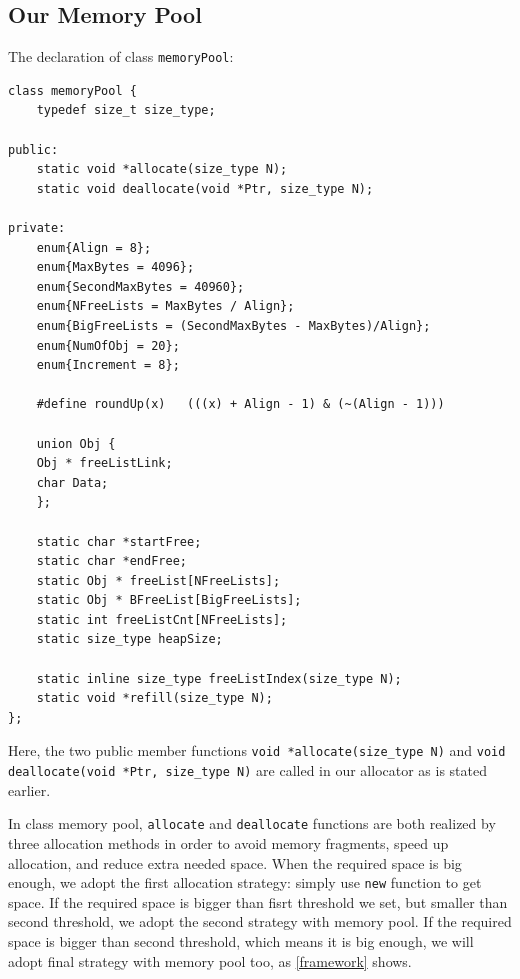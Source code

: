 \documentclass{article}
\begin{document}
\subsection{Our Memory Pool}
The declaration of class \texttt{memoryPool}:
\begin{lstlisting}
class memoryPool {
	typedef size_t size_type;
	
public:
	static void *allocate(size_type N);
	static void deallocate(void *Ptr, size_type N);
	
private:
	enum{Align = 8};
	enum{MaxBytes = 4096};
	enum{SecondMaxBytes = 40960};
	enum{NFreeLists = MaxBytes / Align};
	enum{BigFreeLists = (SecondMaxBytes - MaxBytes)/Align};
	enum{NumOfObj = 20};
	enum{Increment = 8};
	
	#define roundUp(x)	 (((x) + Align - 1) & (~(Align - 1)))
	
	union Obj {
	Obj * freeListLink;
	char Data;
	};
	
	static char *startFree;
	static char *endFree;
	static Obj * freeList[NFreeLists];
	static Obj * BFreeList[BigFreeLists];
	static int freeListCnt[NFreeLists];
	static size_type heapSize;
	
	static inline size_type freeListIndex(size_type N);
	static void *refill(size_type N);
};
\end{lstlisting}

Here, the two public member functions \texttt{void *allocate(size\_type N)} and \texttt{void deallocate(void *Ptr, size\_type N)} are called in our allocator as is stated earlier.

In class memory pool, \texttt{allocate} and \texttt{deallocate} functions are both realized by three allocation methods in order to avoid memory fragments, speed up allocation, and reduce extra needed space. When the required space is big enough, we adopt the first allocation strategy: simply use \texttt{new} function to get space. If the required space is bigger than fisrt threshold we set, but smaller than second threshold, we adopt the second strategy with memory pool. If the required space is bigger than second threshold, which means it is big enough, we will adopt final strategy with memory pool too, as \ref{framework} shows. 
\end{document}
